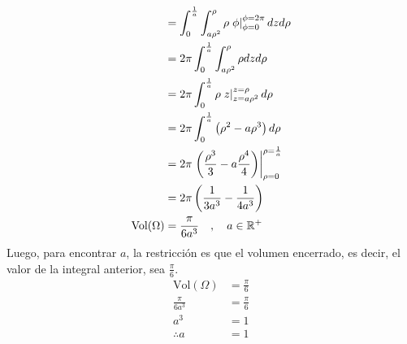 \begin{solution}
\begin{align*}
        &=\int^{\frac{1}{a}}_{0} \int^{\rho}_{a\rho^2} \rho \left. \phi \right|^{\phi=2\pi}_{\phi=0} dz d\rho \\
        &=2\pi \int^{\frac{1}{a}}_{0} \int^{\rho}_{a\rho^2} \rho dz d\rho \\
        &=2\pi \int^{\frac{1}{a}}_{0} \rho \left.z\right|^{z=\rho}_{z=a\rho^2} d\rho \\
        &=2\pi \int^{\frac{1}{a}}_{0} \left( \rho^2-a\rho^3 \right) d\rho \\
        &=2\pi \left.\left( \frac{\rho^3}{3}-a\frac{\rho^4}{4}\right)\right|^{\rho=\frac{1}{a}}_{\rho=0}\\
        &=2\pi \left(\frac{1}{3a^3}-\frac{1}{4a^3}\right)\\
        \text{Vol}(\Omega)&=\frac{\pi}{6a^3} \quad , \quad a\in \mathbb{R}^+
    \end{align*}
    Luego, para encontrar $a$, la restricción es que el volumen encerrado, es decir, el valor de la integral anterior, sea $\frac{\pi}{6}$.
    \begin{align*}
        \text{Vol}(\Omega)&=\frac{\pi}{6}\\
        \frac{\pi}{6a^3}&=\frac{\pi}{6}\\
        a^3&=1\\
        \therefore a&=1
    \end{align*}

\end{solution}


